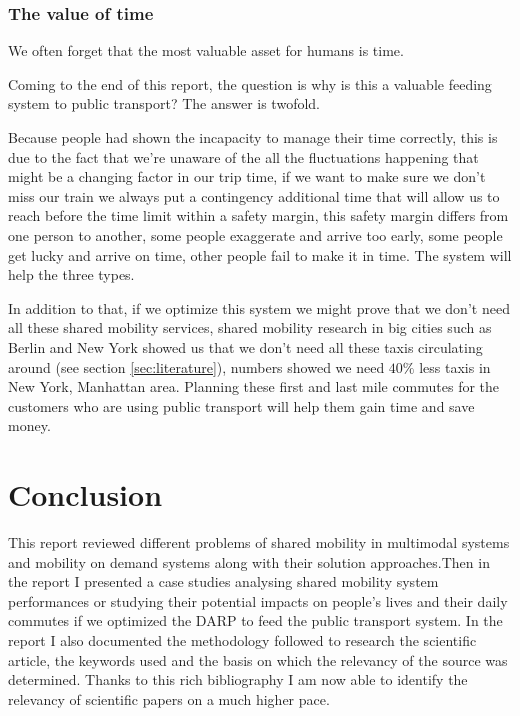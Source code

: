 \documentclass{article}
\begin{document}
\subsubsection*{The value of time}

\begin{flushright}
We often forget that the most valuable asset for humans is time.
\end{flushright}

Coming to the end of this report, the question is why is this a valuable feeding system to public transport?
The answer is twofold. 

Because people had shown the incapacity to manage their time correctly, this is due to the fact that we\rq{re} unaware of the all the fluctuations happening that might be a changing factor in our trip time, if we want to make sure we don\rq{t} miss our train we always put a contingency additional time that will allow us to reach before the time limit within a safety margin, this safety margin differs from one person to another, some people exaggerate and arrive too early, some people get lucky and arrive on time, other people fail to 
make it in time. The system will help the three types. 


In addition to that, if we optimize this system we might prove that we don\rq{t} need all these shared mobility services, shared mobility research in big cities such as Berlin and New York showed us that we don\rq{t} need all these
taxis circulating around (see section \ref{sec:literature}), numbers showed we need $40\%$ less taxis in New York, Manhattan area. Planning these first and last mile commutes for the customers who are using public transport will help them gain time and save money.


\section{Conclusion}
\label{sec:conclusion}

This report reviewed different problems of shared mobility in multimodal systems and mobility on demand systems along with their solution approaches.Then in the report I presented a case studies 
analysing shared mobility system performances or studying their potential impacts on people’s lives and their daily commutes if we optimized the DARP to feed the public transport system.
In the report I also documented the methodology followed to research the scientific article, the keywords used and the basis on which the relevancy of the source was determined. Thanks to this rich bibliography I am now able to identify the relevancy of scientific 
papers on a much higher pace.
\end{document}
